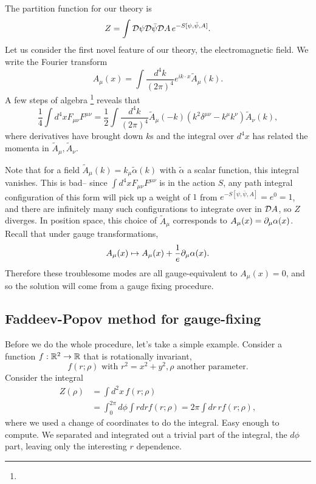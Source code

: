 The partition function for our theory is
\begin{equation}
    Z=\int \mathcal{D} \psi \mathcal{D} \bar \psi \mathcal{D} A \, e^{-S[\psi,\bar \psi,A]}.
\end{equation}
Let us consider the first novel feature of our theory, the electromagnetic field. We write the Fourier transform
\begin{equation}
    A_\mu(x)=\int \frac{d^4k}{(2\pi)^4} e^{ik\cdot x}\tilde A_\mu(k).
\end{equation}
A few steps of algebra%
    \footnote{}
reveals that
\begin{equation}
    \frac{1}{4}\int d^4x F_{\mu\nu}F^{\mu\nu} = \frac{1}{2}\int\frac{d^4k}{(2\pi)^4} \tilde A_\mu(-k)(k^2\delta^{\mu\nu}-k^\mu k^\nu)\tilde A_\nu(k),
\end{equation}
where derivatives have brought down $k$s and the integral over $d^4x$ has related the momenta in $\tilde A_\mu,\tilde A_\nu$.

Note that for a field $\tilde A_\mu(k)=k_\mu \tilde \alpha(k)$ with $\tilde \alpha$ a scalar function, this integral vanishes. This is bad-- since $\int d^4x F_{\mu\nu} F^{\mu\nu}$ is in the action $S$, any path integral configuration of this form will pick up a weight of $1$ from $e^{-S[\psi,\bar\psi,A]}=e^0=1$, and there are infinitely many such configurations to integrate over in $\mathcal{D} A$, so $Z$ diverges. In position space, this choice of $\tilde A_\mu$ corresponds to $A_\mu(x)=\partial_\mu\alpha(x)$.
Recall that under gauge transformations,
\begin{equation}
    A_\mu(x)\mapsto A_\mu(x) +\frac{1}{e} \partial_\mu \alpha(x).
\end{equation}
Therefore these troublesome modes are all gauge-equivalent to $A_\mu(x)=0$, and so the solution will come from a gauge fixing procedure.

\subsection*{Faddeev-Popov method for gauge-fixing} Before we do the whole procedure, let's take a simple example. Consider a function $f:\mathbb{R}^2\to \mathbb{R}$ that is rotationally invariant,
\begin{equation}
    f(r;\rho)\text{ with }r^2=x^2+y^2,\rho\text{ another parameter}.
\end{equation}
Consider the integral
\begin{align*}
    Z(\rho)&=\int d^2x\, f(r;\rho)\\
        &= \int_0^{2\pi} d\phi \int rdr f(r;\rho) =2\pi \int dr\, r f(r;\rho),
\end{align*}
where we used a change of coordinates to do the integral. Easy enough to compute. We separated and integrated out a trivial part of the integral, the $d\phi$ part, leaving only the interesting $r$ dependence.

